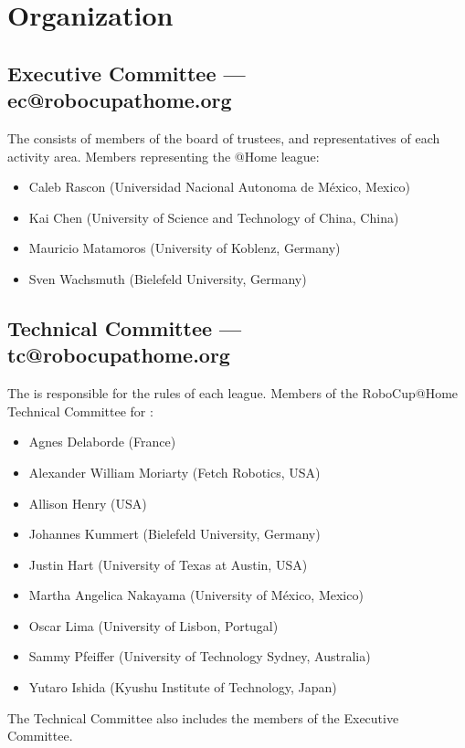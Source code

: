 \section{Organization}

\subsection{Executive Committee --- ec@robocupathome.org}
\label{sec:ec}
The  consists of members of the board of trustees, and representatives of each activity area. Members representing the @Home league:
\begin{itemize}
	\item Caleb Rascon (Universidad Nacional Autonoma de México, Mexico)
	\item Kai Chen (University of Science and Technology of China, China)
	\item Mauricio Matamoros (University of Koblenz, Germany)
	\item Sven Wachsmuth (Bielefeld University, Germany)
\end{itemize}

\subsection{Technical Committee --- tc@robocupathome.org}
\label{sec:tc}
The  is responsible for the rules of each league. Members of the RoboCup@Home Technical Committee for \YEAR:
\begin{itemize}
	\item Agnes Delaborde (France) %
	\item Alexander William Moriarty (Fetch Robotics, USA)
	\item Allison Henry (USA) %
	\item Johannes Kummert (Bielefeld University, Germany)
	\item Justin Hart (University of Texas at Austin, USA)
	\item Martha Angelica Nakayama (University of México, Mexico)
	\item Oscar Lima (University of Lisbon, Portugal)
	\item Sammy Pfeiffer (University of Technology Sydney, Australia)
	\item Yutaro Ishida (Kyushu Institute of Technology, Japan)
\end{itemize}
The Technical Committee also includes the members of the Executive Committee.

